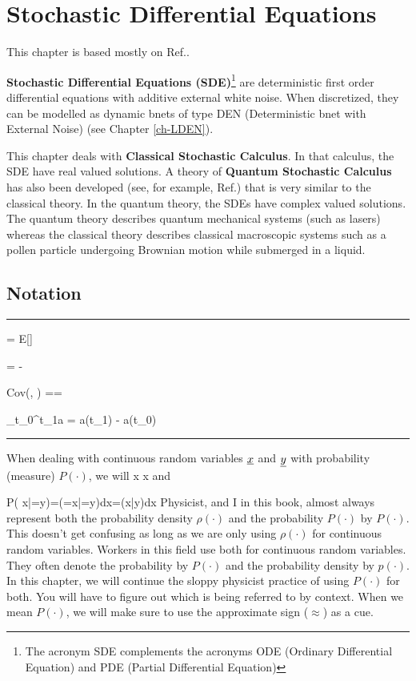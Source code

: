 \chapter{Stochastic Differential Equations}
\label{ch-stochastic-diff-eqns}

This chapter is based mostly on Ref.\cite{sar-sol}.

{\bf Stochastic Differential Equations (SDE)}\footnote{The 
acronym SDE complements the acronyms ODE (Ordinary Differential Equation)
and PDE (Partial Differential Equation)}
are deterministic first order differential equations with additive external white noise. When discretized, they
can be modelled as dynamic bnets of type
DEN (Deterministic bnet with External Noise) (see Chapter \ref{ch-LDEN}).

This chapter deals with {\bf Classical Stochastic Calculus}. In that calculus,
the SDE have real valued solutions.
A theory of {\bf Quantum Stochastic Calculus} has also been developed (see,
for example,  Ref.\cite{part-quantum-sde}) that is
very similar to the classical
theory. In the quantum theory, the SDEs  have complex valued solutions. The quantum theory describes quantum
mechanical systems (such as lasers)
whereas the classical theory describes classical macroscopic systems such as a
pollen particle undergoing Brownian motion
while submerged in a liquid.


\section{Notation}

\hrule{}

\beq
\av{\rva} = E[\rva]
\eeq

\beq
\Delta \rva = \rva - \av{\rva}
\eeq

\beq
Cov(\rva, \rvb) =\av{\rva, \rvb}=
\av{\Delta\rva \Delta\rvb}
\eeq

\beq
\Delta_{t_0}^{t_1}a = a(t_1) - a(t_0)
\eeq
\hrule
{}

When dealing with  continuous random variables 
$\rvx$ and $\rvy$ with probability (measure) $P(\cdot)$, we will 
\beq
{}\quad
\rvx\in [x, x+dx]\quad
{}\quad \rvx{}x \quad {}
\quad\rvx\approx x\eeq
and 

\beq
P(\rvx{} x|\rvy=y)=\rho(\rvx=x|\rvy=y)dx=\rho(x|y)dx
\eeq
Physicist, and I in this book,  almost always
represent both the 
probability density $\rho(\cdot)$ and the 
probability $P(\cdot)$
by $P(\cdot)$. This
doesn't get confusing 
as long as we
are only using $\rho(\cdot)$
for continuous random variables. 
Workers in this field use both for continuous random variables. 
They often denote the probability by $P(\cdot)$ and the probability density by $p(\cdot)$.
In this chapter, we will continue
the sloppy physicist
practice of using $P(\cdot)$ for both.
You will have to figure out
which is being referred to by context. When we mean $P(\cdot)$, we will make sure to use the approximate sign ($\approx$) as a cue. 


